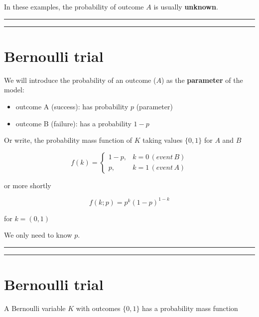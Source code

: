 \documentclass[
]{book}
\providecommand{\tightlist}{%
  \setlength{\itemsep}{0pt}\setlength{\parskip}{0pt}}
\begin{document}
In these examples, the probability of outcome \(A\) is usually \textbf{unknown}.

\begin{center}\rule{0.5\linewidth}{0.5pt}\end{center}

\begin{center}\rule{0.5\linewidth}{0.5pt}\end{center}

\hypertarget{bernoulli-trial-1}{%
\section{Bernoulli trial}\label{bernoulli-trial-1}}

We will introduce the probability of an outcome (\(A\)) as the \textbf{parameter} of the model:

\begin{itemize}
\tightlist
\item
  outcome A (success): has probability \(p\) (parameter)
\item
  outcome B (failure): has a probability \(1-p\)
\end{itemize}

Or write, the probability mass function of \(K\) taking values \(\{0, 1\}\) for \(A\) and \(B\)

\[
    f(k)= 
\begin{cases}
    1-p,&  k=0\, (event\, B)\\
    p,& k=1\, (event\, A) 
\end{cases}
\]

or more shortly

\[f(k; p)=p^k(1-p)^{1-k} \]

for \(k=(0,1)\)

We only need to know \(p\).

\begin{center}\rule{0.5\linewidth}{0.5pt}\end{center}

\begin{center}\rule{0.5\linewidth}{0.5pt}\end{center}

\hypertarget{bernoulli-trial-2}{%
\section{Bernoulli trial}\label{bernoulli-trial-2}}

A Bernoulli variable \(K\) with outcomes \(\{0, 1\}\) has a probability mass function
\end{document}

